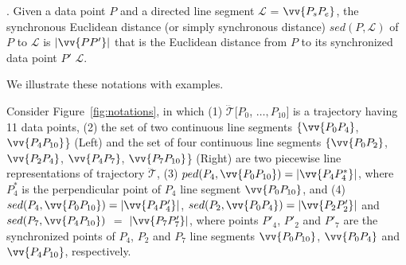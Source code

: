 . Given a data point $P$ and a directed line segment $\mathcal{L}$ = $\vv{P_{s}P_{e}}$, the synchronous Euclidean distance (or simply synchronous distance) $sed(P, \mathcal{L})$ of $P$ to $\mathcal{L}$ is $|\vv{PP'}|$ that is the Euclidean distance from $P$ to its synchronized data point $P'$ \wrt $\mathcal{L}$. %

We illustrate these notations with examples.


\begin{example}
	\label{exm-notations}
	Consider Figure~\ref{fig:notations}, in which
	(1) $\dddot{\mathcal{T}}[P_0$, $\ldots, P_{10}]$ is a trajectory having 11 data points,
	 (2) the set of two continuous line segments $\{\vv{P_0P_4}$, $\vv{P_4P_{10}}$\} (Left) and the set of four continuous line segments $\{\vv{P_0P_2}$, $\vv{P_2P_4}$, $\vv{P_4P_7}$, $\vv{P_7P_{10}}$\} (Right) are two piecewise line representations of trajectory $\dddot{\mathcal{T}}$,
	(3) $ped(P_4, \vv{P_0P_{10}})=|\vv{P_4P^*_4}|$, where $P^*_4$ is the perpendicular point of $P_4$ \wrt line segment $\vv{P_0P_{10}}$, and
	(4) $sed(P_4, \vv{P_0P_{10}})= |\vv{P_4P'_4}|$, $sed(P_2, \vv{P_0P_{4}})= |\vv{P_2P'_2}|$ and $sed(P_7, \vv{P_4P_{10}})$ $=$ $|\vv{P_7P'_7}|$,
	where points $P'_4$, $P'_2$ and $P'_7$ are the synchronized points of $P_4$, $P_2$ and $P_7$ \wrt line segments $\vv{P_0P_{10}}$, $\vv{P_0P_{4}}$ and $\vv{P_4P_{10}}$, respectively.
\end{example}


